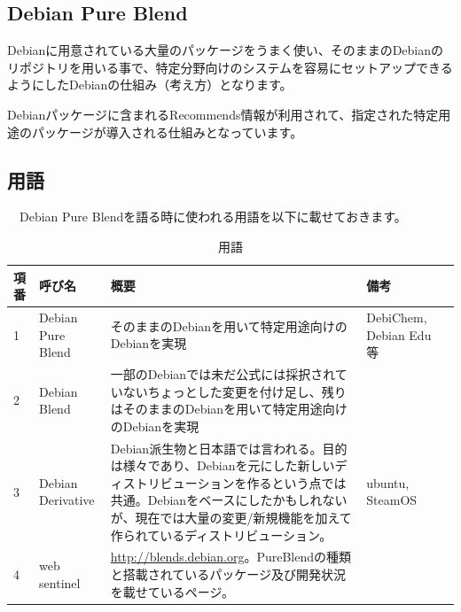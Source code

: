 \documentclass[mingoth,a4paper]{jsarticle}
\begin{document}

\subsection{Debian Pure Blend}

 Debianに用意されている大量のパッケージをうまく使い、そのままのDebianのリポジトリを用いる事で、特定分野向けのシステムを容易にセットアップできるようにしたDebianの仕組み（考え方）となります。

 Debianパッケージに含まれるRecommends情報が利用されて、指定された特定用途のパッケージが導入される仕組みとなっています。

\subsection{用語}

　Debian Pure Blendを語る時に使われる用語を以下に載せておきます\cite{debian-pure-blends-wiki}。

\begin{table}[ht]
\begin{center}
\begin{tabular}{|l|l|p{9cm}|p{3cm}|l|}
\hline 
項番&呼び名&概要&備考 \\ \hline \hline
1 & Debian Pure Blend & そのままのDebianを用いて特定用途向けのDebianを実現 & DebiChem, Debian Edu等 \\ \hline
2 & Debian Blend & 一部のDebianでは未だ公式には採択されていないちょっとした変更を付け足し、残りはそのままのDebianを用いて特定用途向けのDebianを実現 & \\ \hline
3 & Debian Derivative & Debian派生物と日本語では言われる。目的は様々であり、Debianを元にした新しいディストリビューションを作るという点では共通。Debianをベースにしたかもしれないが、現在では大量の変更/新規機能を加えて作られているディストリビューション。& ubuntu, SteamOS　\\ \hline
4 & web sentinel & \url{http://blends.debian.org}。PureBlendの種類と搭載されているパッケージ及び開発状況を載せているページ。 & \\ \hline
\end{tabular}
\label{tab:debian-blends-terms}
\caption{用語}
\end{center}
\end{table}
\end{document}
